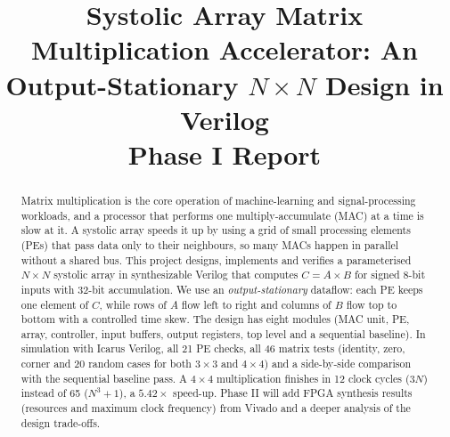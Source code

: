 \documentclass[conference,a4paper]{IEEEtran}
\begin{document}
\title{Systolic Array Matrix Multiplication Accelerator: An Output-Stationary $N\times N$ Design in Verilog\\[2pt]
\large Phase I Report}

\author{
\and
{}
\and
{}
\and
{}
\and
{}
\and
{}
}

\maketitle

\begin{abstract}
Matrix multiplication is the core operation of machine-learning and signal-processing workloads, and a processor that performs one multiply-accumulate (MAC) at a time is slow at it. A systolic array speeds it up by using a grid of small processing elements (PEs) that pass data only to their neighbours, so many MACs happen in parallel without a shared bus. This project designs, implements and verifies a parameterised $N\times N$ systolic array in synthesizable Verilog that computes $C = A \times B$ for signed 8-bit inputs with 32-bit accumulation. We use an \emph{output-stationary} dataflow: each PE keeps one element of $C$, while rows of $A$ flow left to right and columns of $B$ flow top to bottom with a controlled time skew. The design has eight modules (MAC unit, PE, array, controller, input buffers, output registers, top level and a sequential baseline). In simulation with Icarus Verilog, all 21 PE checks, all 46 matrix tests (identity, zero, corner and 20 random cases for both $3\times3$ and $4\times4$) and a side-by-side comparison with the sequential baseline pass. A $4\times4$ multiplication finishes in 12 clock cycles ($3N$) instead of 65 ($N^3+1$), a $5.42\times$ speed-up. Phase II will add FPGA synthesis results (resources and maximum clock frequency) from Vivado and a deeper analysis of the design trade-offs.
\end{abstract}
\end{document}
